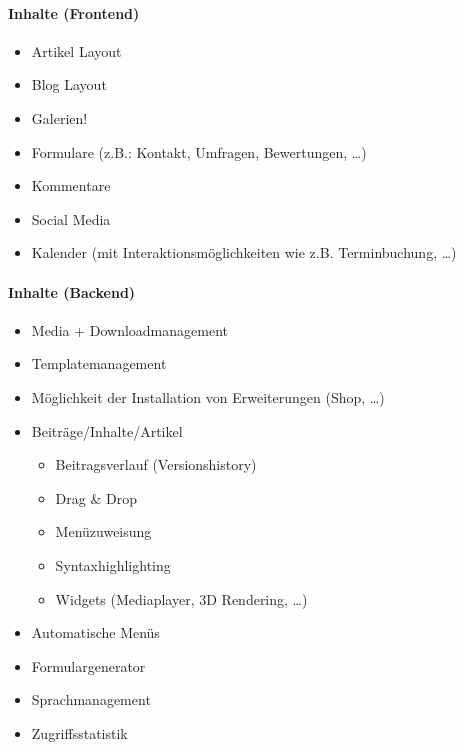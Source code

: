 	\paragraph{Inhalte (Frontend)}
		\begin{itemize}
			\item Artikel Layout
			\item Blog Layout
			\item Galerien!
			\item Formulare (z.B.: Kontakt, Umfragen, Bewertungen, \ldots)
			\item Kommentare
			\item Social Media
			\item Kalender (mit Interaktionsmöglichkeiten wie z.B. Terminbuchung, \ldots)
		\end{itemize}
		
	\paragraph{Inhalte (Backend)}
		\begin{itemize}
			\item Media + Downloadmanagement
			\item Templatemanagement
			\item Möglichkeit der Installation von Erweiterungen (Shop, \ldots)
			\item Beiträge/Inhalte/Artikel
			\begin{itemize}
				\item Beitragsverlauf (Versionshistory)
				\item Drag \& Drop
				\item Menüzuweisung
				\item Syntaxhighlighting
				\item Widgets (Mediaplayer, 3D Rendering, \ldots)
			\end{itemize}
			\item Automatische Menüs
			\item Formulargenerator
			\item Sprachmanagement
			\item Zugriffsstatistik
		\end{itemize}